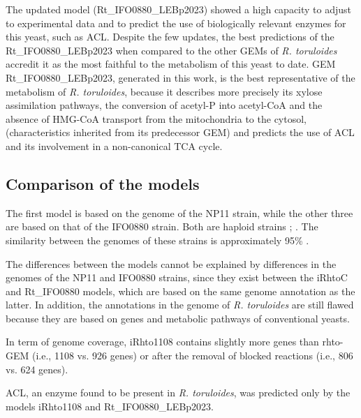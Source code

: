 The updated model (Rt\_IFO0880\_LEBp2023) showed a high capacity to adjust to experimental data and to predict the use of biologically relevant enzymes for this yeast, 
such as ACL. Despite the few updates, the best predictions of the Rt\_IFO0880\_LEBp2023 when compared to the other GEMs of \textit{R. toruloides} accredit it as the most faithful
 to the metabolism of this yeast to date. GEM Rt\_IFO0880\_LEBp2023, generated in this work, is the best representative of the metabolism of \textit{R. toruloides}, 
 because it describes more precisely its xylose
 assimilation pathways, the conversion of acetyl-P into acetyl-CoA and the absence of HMG-CoA transport from the mitochondria to the cytosol, 
 (characteristics inherited from its predecessor GEM) and predicts the use of ACL and its involvement in a non-canonical TCA cycle. \cite{DeBiaggi2023}

\subsection{Comparison of the models}

The first model is based on the genome of the NP11 strain, while the other three are based on that of the IFO0880 strain. Both are haploid strains \cite{BANNO1967}; \cite{Zhu2012}. 
The similarity between the genomes of these strains is approximately 95\% \cite{Schultz2022}.

The differences between the models cannot be explained by differences in the genomes of the NP11 and IFO0880 strains, since they exist 
between the iRhtoC and Rt\_IFO0880 models, which are based on the same genome annotation as the latter. In addition, the annotations in 
the genome of \textit{R. toruloides} are still flawed because they are based on genes and metabolic pathways of conventional yeasts. \cite{DeBiaggi2023}

In term of genome coverage, iRhto1108 contains slightly more genes than rhto-GEM (i.e., 1108 vs. 926
genes) or after the removal of blocked reactions (i.e., 806 vs. 624 genes). \cite{Dinh2019}

ACL, an enzyme found to be present in \textit{R. toruloides}, was predicted only by the models iRhto1108 and Rt\_IFO0880\_LEBp2023.














